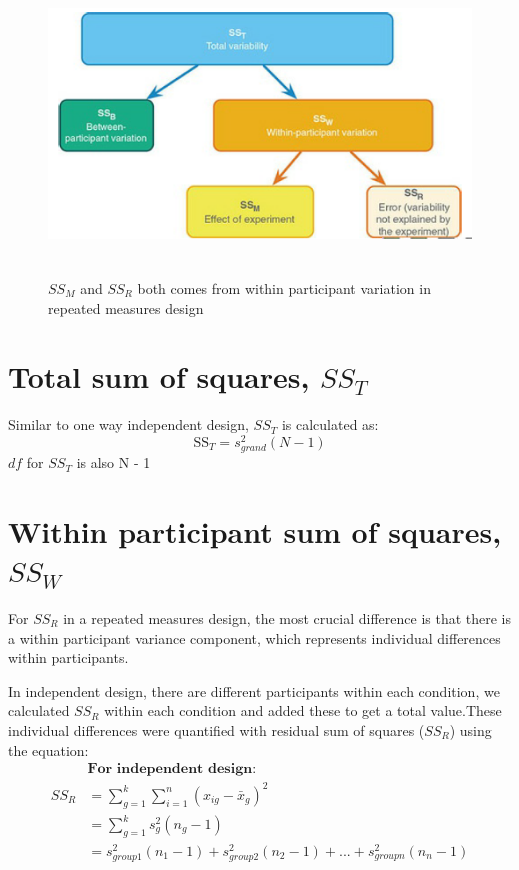 \begin{figure}[t!]
	\includegraphics[width=1\textwidth,height=80mm]{Chapter 15 GLM 4 Repeated-measures designs/withinparticipantvariance.PNG}
	\caption{$SS_M$ and $SS_R$ both comes from within participant variation in repeated measures design}
\end{figure}

\section{Total sum of squares, $SS_T$}
Similar to one way independent design, $SS_T$ is calculated as:
\begin{equation}
\text{SS}_T = s^2_{grand}(N-1)
\end{equation}
$df$ for $SS_T$ is also N - 1

\section{Within participant sum of squares,$SS_W$}
For $SS_R$ in a repeated measures design, the most crucial difference is that there is a within participant variance component, which represents individual differences within participants.

 In independent design, there are different participants within each condition, we calculated $SS_R$ within each condition and added these to get a total value.These individual differences were quantified with residual sum of squares ($SS_R$) using the equation:
\begin{equation}
\begin{split}
&\textbf{For independent design}: \\
SS_R& = \sum^k_{g=1} \sum^n_{i=1} (x_{ig}-\bar{x}_g)^2 \\
& = \sum^k_{g=1} s^2_g(n_g - 1)\\
& = s^2_{group1}(n_1 - 1) +  s^2_{group2}(n_2 - 1) + ... +  s^2_{group n}(n_n - 1)
\end{split}
\end{equation}

